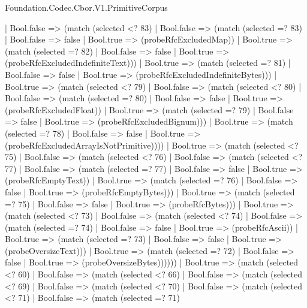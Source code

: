 \begin{lexlean}{Foundation.Codec.Cbor.V1.PrimitiveCorpus}
\begin{semanticmodule}
{                | Bool.false => (match (selected <? 83)
                  | Bool.false => (match (selected =? 83)
                    | Bool.false => false
                    | Bool.true => (probeRfcExcludedMap))
                  | Bool.true => (match (selected =? 82)
                    | Bool.false => false
                    | Bool.true => (probeRfcExcludedIndefiniteText)))
                | Bool.true => (match (selected =? 81)
                  | Bool.false => false
                  | Bool.true => (probeRfcExcludedIndefiniteBytes)))
              | Bool.true => (match (selected <? 79)
                | Bool.false => (match (selected <? 80)
                  | Bool.false => (match (selected =? 80)
                    | Bool.false => false
                    | Bool.true => (probeRfcExcludedFloat))
                  | Bool.true => (match (selected =? 79)
                    | Bool.false => false
                    | Bool.true => (probeRfcExcludedBignum)))
                | Bool.true => (match (selected =? 78)
                  | Bool.false => false
                  | Bool.true => (probeRfcExcludedArrayIsNotPrimitive))))
            | Bool.true => (match (selected <? 75)
              | Bool.false => (match (selected <? 76)
                | Bool.false => (match (selected <? 77)
                  | Bool.false => (match (selected =? 77)
                    | Bool.false => false
                    | Bool.true => (probeRfcEmptyText))
                  | Bool.true => (match (selected =? 76)
                    | Bool.false => false
                    | Bool.true => (probeRfcEmptyBytes)))
                | Bool.true => (match (selected =? 75)
                  | Bool.false => false
                  | Bool.true => (probeRfcBytes)))
              | Bool.true => (match (selected <? 73)
                | Bool.false => (match (selected <? 74)
                  | Bool.false => (match (selected =? 74)
                    | Bool.false => false
                    | Bool.true => (probeRfcAscii))
                  | Bool.true => (match (selected =? 73)
                    | Bool.false => false
                    | Bool.true => (probeOversizeText)))
                | Bool.true => (match (selected =? 72)
                  | Bool.false => false
                  | Bool.true => (probeOversizeBytes))))))
        | Bool.true => (match (selected <? 60)
          | Bool.false => (match (selected <? 66)
            | Bool.false => (match (selected <? 69)
              | Bool.false => (match (selected <? 70)
                | Bool.false => (match (selected <? 71)
                  | Bool.false => (match (selected =? 71)
}
\end{semanticmodule}
\end{lexlean}
